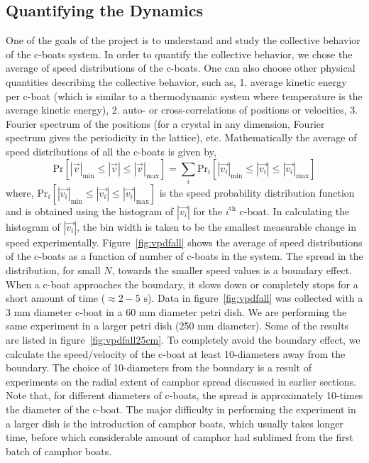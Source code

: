 \documentclass[12pt]{article}
\begin{document}
\subsection{Quantifying the Dynamics}
One of the goals of the project is to understand and study the collective behavior of the c-boats system. In order to quantify the collective behavior, we chose the average of speed distributions of the c-boats. One can also choose other physical quantities describing the collective behavior, such as, 1. average kinetic energy per c-boat (which is similar to a thermodynamic system where temperature is the average kinetic energy), 2. auto- or cross-correlations of positions or velocities, 3. Fourier spectrum of the positions (for a crystal in any dimension, Fourier spectrum gives the periodicity in the lattice), etc. Mathematically the average of speed distributions of all the c-boats is given by,
\begin{equation}
\mathrm{Pr}\left[|\vec{v}|_{\mathrm{min}} \leq |\vec{v}| \leq |\vec{v}|_{\mathrm{max}}\right] = \sum_{i}\mathrm{Pr}_{i}\left[|\vec{v_{i}}|_{\mathrm{min}} \leq |\vec{v_{i}}| \leq |\vec{v_{i}}|_{\mathrm{max}}\right]
\end{equation}
where, $\mathrm{Pr}_{i}\left[|\vec{v_{i}}|_{\mathrm{min}} \leq |\vec{v_{i}}| \leq |\vec{v_{i}}|_{\mathrm{max}}\right]$ is the speed probability distribution function and is obtained using the histogram of $|\vec{v_{i}}|$ for the $i^\textrm{th}$ c-boat. In calculating the histogram of $|\vec{v_{i}}|$, the bin width is taken to be the smallest measurable change in speed experimentally. Figure~\ref{fig:vpdfall} shows the average of speed distributions of the c-boats as a function of number of c-boats in the system. The spread in the distribution, for small $N$, towards the smaller speed values is a boundary effect. When a c-boat approaches the boundary, it slows down or completely stops for a short amount of time ($\approx 2-5 \textrm{ s}$). Data in figure~\ref{fig:vpdfall} was collected with a 3 mm diameter c-boat in a 60 mm diameter petri dish. We are performing the same experiment in a larger petri dish (250 mm diameter). Some of the results are listed in figure~\ref{fig:vpdfall25cm}. To completely avoid the boundary effect, we calculate the speed/velocity of the c-boat at least 10-diameters away from the boundary. The choice of 10-diameters from the boundary is a result of experiments on the radial extent of camphor spread discussed in earlier sections. Note that, for different diameters of c-boats, the spread is approximately 10-times the diameter of the c-boat. The major difficulty in performing the experiment in a larger dish is the introduction of camphor boats, which usually takes longer time, before which considerable amount of camphor had sublimed from the first batch of camphor boats. 
\end{document}
